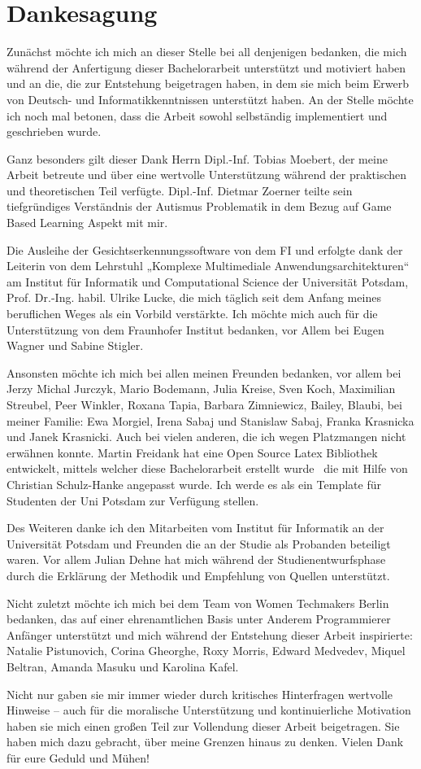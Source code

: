 \section{Dankesagung}
Zunächst möchte ich mich an dieser Stelle bei all denjenigen bedanken, die mich während der Anfertigung dieser Bachelorarbeit unterstützt und motiviert haben und an die, die zur Entstehung beigetragen haben, in dem sie mich beim Erwerb von Deutsch- und Informatikkenntnissen unterstützt haben. An der Stelle möchte ich noch mal betonen, dass die Arbeit sowohl selbständig implementiert und geschrieben wurde.


Ganz besonders gilt dieser Dank Herrn Dipl.-Inf. Tobias Moebert, der meine Arbeit betreute und über eine wertvolle Unterstützung während der praktischen und theoretischen Teil verfügte.
Dipl.-Inf. Dietmar Zoerner teilte sein tiefgründiges Verständnis der Autismus Problematik in dem Bezug auf Game Based Learning Aspekt mit mir.

Die Ausleihe der Gesichtserkennungssoftware von dem FI und erfolgte dank der Leiterin von dem Lehrstuhl „Komplexe Multimediale Anwendungsarchitekturen“ am Institut für Informatik und Computational Science der Universität Potsdam, Prof. Dr.-Ing. habil. Ulrike Lucke, die mich täglich seit dem Anfang meines beruflichen Weges als ein Vorbild verstärkte.
Ich möchte mich auch für die Unterstützung von dem Fraunhofer Institut bedanken, vor Allem bei Eugen Wagner und Sabine Stigler.

Ansonsten möchte ich mich bei allen meinen Freunden bedanken, vor allem bei Jerzy Michal Jurczyk, Mario Bodemann, Julia Kreise, Sven Koch, Maximilian Streubel, Peer Winkler, Roxana Tapia, Barbara Zimniewicz, Bailey, Blaubi, bei meiner Familie: Ewa Morgiel, Irena Sabaj und Stanislaw Sabaj, Franka Krasnicka und Janek Krasnicki. Auch bei vielen anderen, die ich wegen Platzmangen nicht erwähnen konnte.
Martin Freidank hat eine Open Source Latex Bibliothek entwickelt, mittels welcher diese Bachelorarbeit erstellt wurde~\cite{latex} die mit Hilfe von Christian Schulz-Hanke angepasst wurde. Ich werde es als ein Template für Studenten der Uni Potsdam zur Verfügung stellen.

Des Weiteren danke ich den Mitarbeiten vom Institut für Informatik an der Universität Potsdam und Freunden die an der Studie als Probanden beteiligt waren. Vor allem Julian Dehne hat mich während der Studienentwurfsphase durch die Erklärung der Methodik und Empfehlung von Quellen unterstützt.

Nicht zuletzt möchte ich mich bei dem Team von Women Techmakers Berlin bedanken, das auf einer ehrenamtlichen Basis unter Anderem Programmierer Anfänger unterstützt und mich während der Entstehung dieser Arbeit inspirierte: Natalie Pistunovich, Corina Gheorghe, Roxy Morris, Edward Medvedev, Miquel Beltran, Amanda Masuku und Karolina Kafel.

Nicht nur gaben sie mir immer wieder durch kritisches Hinterfragen wertvolle Hinweise – auch für die moralische Unterstützung und kontinuierliche Motivation haben sie mich einen großen Teil zur Vollendung dieser Arbeit beigetragen. Sie haben mich dazu gebracht, über meine Grenzen hinaus zu denken. 
Vielen Dank für eure Geduld und Mühen!

